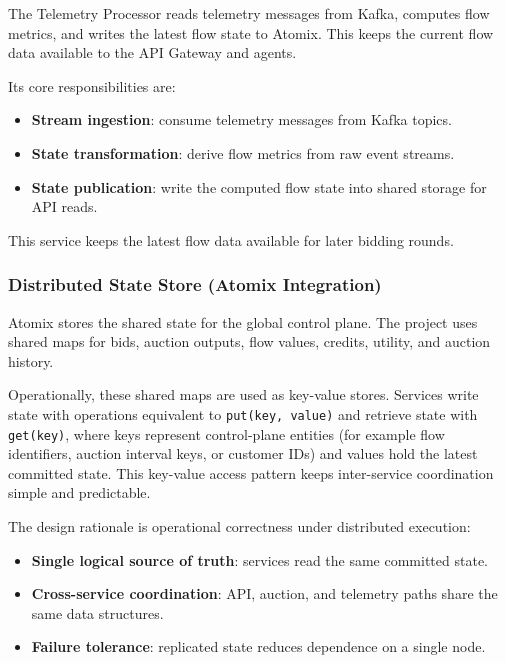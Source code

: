 The Telemetry Processor reads telemetry messages from Kafka, computes flow metrics, and writes the latest flow state to Atomix. This keeps the current flow data available to the API Gateway and agents.

Its core responsibilities are:

\begin{itemize}
    \item \textbf{Stream ingestion}: consume telemetry messages from Kafka topics.
    \item \textbf{State transformation}: derive flow metrics from raw event streams.
    \item \textbf{State publication}: write the computed flow state into shared storage for API reads.
\end{itemize}

This service keeps the latest flow data available for later bidding rounds.

\subsubsection{Distributed State Store (Atomix Integration)}

Atomix stores the shared state for the global control plane. The project uses shared maps for bids, auction outputs, flow values, credits, utility, and auction history.

Operationally, these shared maps are used as key-value stores. Services write state with operations equivalent to \texttt{put(key, value)} and retrieve state with \texttt{get(key)}, where keys represent control-plane entities (for example flow identifiers, auction interval keys, or customer IDs) and values hold the latest committed state. This key-value access pattern keeps inter-service coordination simple and predictable.

The design rationale is operational correctness under distributed execution:

\begin{itemize}
    \item \textbf{Single logical source of truth}: services read the same committed state.
    \item \textbf{Cross-service coordination}: API, auction, and telemetry paths share the same data structures.
    \item \textbf{Failure tolerance}: replicated state reduces dependence on a single node.
\end{itemize}


